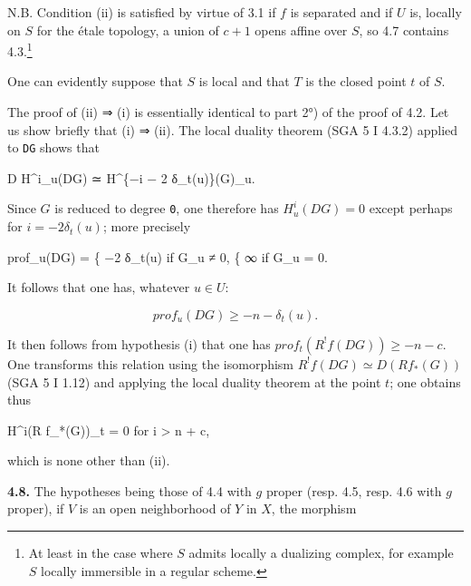 \documentclass[
]{article}
\newenvironment{Shaded}{}{}
\newcommand{\NormalTok}[1]{#1}
\begin{document}
N.B. Condition (ii) is satisfied by virtue of 3.1 if \(f\) is separated
and if \(U\) is, locally on \(S\) for the étale topology, a union of
\(c + 1\) opens affine over \(S\), so 4.7 contains 4.3.\footnote{At
  least in the case where \(S\) admits locally a dualizing complex, for
  example \(S\) locally immersible in a regular scheme.}

One can evidently suppose that \(S\) is local and that \(T\) is the
closed point \(t\) of \(S\).

The proof of (ii) ⇒ (i) is essentially identical to part 2°) of the
proof of 4.2. Let us show briefly that (i) ⇒ (ii). The local duality
theorem (SGA 5 I 4.3.2) applied to \texttt{DG} shows that

\begin{Shaded}
\begin{Highlighting}[]
\NormalTok{D H\^{}i\_u(DG) ≃ H\^{}\{−i − 2 δ\_t(u)\}(G)\_u.}
\end{Highlighting}
\end{Shaded}

Since \(G\) is reduced to degree \texttt{0}, one therefore has
\(H^{i}_{u}(DG) = 0\) except perhaps for \(i = -2 \delta_{t}(u)\); more
precisely

\begin{Shaded}
\begin{Highlighting}[]
\NormalTok{prof\_u(DG) = \{ −2 δ\_t(u)  if G\_u ≠ 0,}
\NormalTok{              \{ ∞          if G\_u = 0.}
\end{Highlighting}
\end{Shaded}

It follows that one has, whatever \(u \in U\):

\[
prof_{u}(DG) \geqslant -n - \delta_{t}(u).
\]

It then follows from hypothesis (i) that one has
\(prof_{t}(R^{!} f(DG)) \geqslant -n - c\). One transforms this relation
using the isomorphism \(R^{!} f(DG) \simeq D(R f_{*}(G))\) (SGA 5 I
1.12) and applying the local duality theorem at the point \(t\); one
obtains thus

\begin{Shaded}
\begin{Highlighting}[]
\NormalTok{H\^{}i(R f\_*(G))\_t = 0 for i \textgreater{} n + c,}
\end{Highlighting}
\end{Shaded}

which is none other than (ii).

\textbf{4.8.} The hypotheses being those of 4.4 with \(g\) proper (resp.
4.5, resp. 4.6 with \(g\) proper), if \(V\) is an open neighborhood of
\(Y\) in \(X\), the morphism
\end{document}
